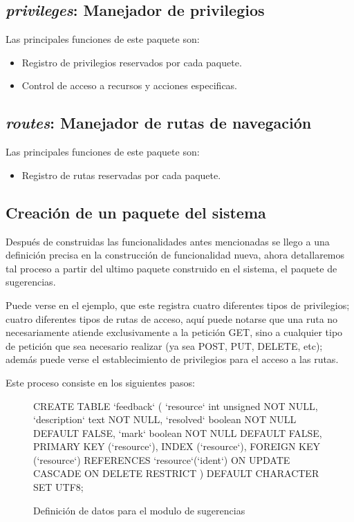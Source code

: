\subsection{\emph{privileges}: Manejador de privilegios}
Las principales funciones de este paquete son:

\begin{itemize}
\item Registro de privilegios reservados por cada paquete.
\item Control de acceso a recursos y acciones especificas.
\end{itemize}

\subsection{\emph{routes}: Manejador de rutas de navegación}
Las principales funciones de este paquete son:

\begin{itemize}
\item Registro de rutas reservadas por cada paquete.
\end{itemize}

\subsection{Creación de un paquete del sistema}
Después de construidas las funcionalidades antes mencionadas se llego a una
definición precisa en la construcción de funcionalidad nueva, ahora detallaremos
tal proceso a partir del ultimo paquete construido en el sistema, el paquete de
sugerencias.

Puede verse en el ejemplo, que este registra cuatro diferentes tipos de
privilegios; cuatro diferentes tipos de rutas de acceso, aquí puede notarse que
una ruta no necesariamente atiende exclusivamente a la petición GET, sino a
cualquier tipo de petición que sea necesario realizar (ya sea POST, PUT, DELETE,
etc); además puede verse el establecimiento de privilegios para el acceso a las
rutas.

Este proceso consiste en los siguientes pasos:

\begin{figure}
\centering
\begin{SQL}
CREATE TABLE `feedback` (
    `resource`    int unsigned NOT NULL,
    `description` text         NOT NULL,
    `resolved`    boolean      NOT NULL DEFAULT FALSE,
    `mark`        boolean      NOT NULL DEFAULT FALSE,
    PRIMARY KEY (`resource`),
    INDEX (`resource`),
    FOREIGN KEY (`resource`) REFERENCES `resource`(`ident`)
        ON UPDATE CASCADE ON DELETE RESTRICT
) DEFAULT CHARACTER SET UTF8;
\end{SQL}
\caption{Definición de datos para el modulo de sugerencias}
\label{code1}
\end{figure}

